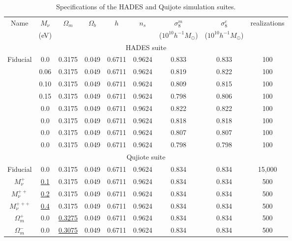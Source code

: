 \documentclass[12pt, letterpaper, preprint]{aastex62}
\newcommand{\smnu}{M_\nu}
\begin{document}
\begin{table}
\caption{Specifications of the HADES and Quijote simulation suites.} 
\begin{center}
\begin{tabular}{ccccccccc} \toprule
    Name  &$\smnu$ & $\Omega_m$ & $\Omega_b$ & $h$ & $n_s$ & $\sigma^m_8$ & $\sigma^c_8$ & realizations \\
      &({\footnotesize eV}) & & & & & ({\footnotesize $10^{10}h^{-1}M_\odot$}) & ({\footnotesize $10^{10}h^{-1}M_\odot$}) & \\[3pt] \hline\hline
    \multicolumn{9}{c}{HADES suite} \\ \hline
    Fiducial    & 0.0   & 0.3175 & 0.049 & 0.6711 & 0.9624 & 0.833 & 0.833 & 100 \\ 
                & 0.06  & 0.3175 & 0.049 & 0.6711 & 0.9624 & 0.819 & 0.822 & 100 \\ 
                & 0.10  & 0.3175 & 0.049 & 0.6711 & 0.9624 & 0.809 & 0.815 & 100 \\ 
                & 0.15  & 0.3175 & 0.049 & 0.6711 & 0.9624 & 0.798 & 0.806 & 100 \\ 
                & 0.0   & 0.3175 & 0.049 & 0.6711 & 0.9624 & 0.822 & 0.822 & 100 \\ 
                & 0.0   & 0.3175 & 0.049 & 0.6711 & 0.9624 & 0.818 & 0.818 & 100 \\ 
                & 0.0   & 0.3175 & 0.049 & 0.6711 & 0.9624 & 0.807 & 0.807 & 100 \\ 
                & 0.0   & 0.3175 & 0.049 & 0.6711 & 0.9624 & 0.798 & 0.798 & 100 \\[3pt]
    \hline \hline
    \multicolumn{9}{c}{Qujiote suite} \\ \hline
    Fiducial 	    & 0.0         & 0.3175 & 0.049 & 0.6711 & 0.9624 & 0.834 & 0.834 & 15,000 \\ 
    $\smnu^+$       & \underline{0.1}   & 0.3175 & 0.049 & 0.6711 & 0.9624 & 0.834 & 0.834 & 500 \\ 
    $\smnu^{++}$    & \underline{0.2}   & 0.3175 & 0.049 & 0.6711 & 0.9624 & 0.834 & 0.834 & 500 \\ 
    $\smnu^{+++}$   & \underline{0.4}   & 0.3175 & 0.049 & 0.6711 & 0.9624 & 0.834 & 0.834 & 500 \\ 
    $\Omega_m^+$    & 0.0   & \underline{ 0.3275} & 0.049 & 0.6711 & 0.9624 & 0.834 & 0.834 & 500 \\ 
    $\Omega_m^-$    & 0.0   & \underline{ 0.3075} & 0.049 & 0.6711 & 0.9624 & 0.834 & 0.834 & 500 \\ 

\end{tabular}
\end{center}
\end{table}
\end{document}
